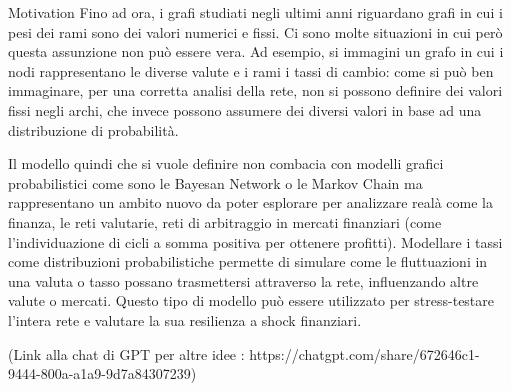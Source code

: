 \begin{projsection}{Motivation}
	Fino ad ora, i grafi studiati negli ultimi anni riguardano grafi in cui i pesi dei rami sono dei valori numerici e fissi.
	Ci sono molte situazioni in cui però questa assunzione non può essere vera. Ad esempio, si immagini un grafo in cui
	i nodi rappresentano le diverse valute e i rami i tassi di cambio: come si può ben immaginare, per una corretta analisi della rete,
	non si possono definire dei valori fissi negli archi, che invece possono assumere dei diversi valori in base ad una distribuzione di probabilità.
	
	Il modello quindi che si vuole definire non combacia con modelli grafici probabilistici come sono le Bayesan Network o le Markov Chain ma rappresentano un ambito nuovo da poter esplorare per analizzare realà come la finanza, le reti valutarie, reti di arbitraggio in mercati finanziari (come l'individuazione di cicli a somma positiva per ottenere profitti). Modellare i tassi come distribuzioni probabilistiche permette di simulare come le fluttuazioni in una valuta o tasso possano trasmettersi attraverso la rete, influenzando altre valute o mercati. Questo tipo di modello può essere utilizzato per stress-testare l’intera rete e valutare la sua resilienza a shock finanziari.
	
	(Link alla chat di GPT per altre idee : https://chatgpt.com/share/672646c1-9444-800a-a1a9-9d7a84307239)
	
	
\end{projsection}